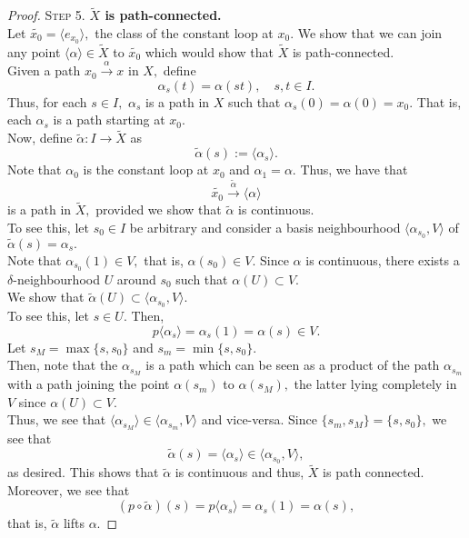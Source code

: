 \documentclass[12pt]{article}
\begin{document}
\begin{proof}
\textsc{Step 5.} \textbf{$\tilde{X}$ is path-connected.}\\
Let $\widetilde{x_0} = \langle e_{x_0}\rangle,$ the class of the constant loop at $x_0.$ We show that we can join any point $\langle \alpha\rangle \in \tilde{X}$ to $\widetilde{x_0}$ which would show that $\tilde{X}$ is path-connected.\\
Given a path $x_0 \overset{\alpha}{\longrightarrow} x$ in $X,$ define
\begin{equation*} 
	\alpha_s(t) = \alpha(st), \quad s, t \in I.
\end{equation*}
Thus, for each $s \in I,$ $\alpha_s$ is a path in $X$ such that $\alpha_s(0) = \alpha(0) = x_0.$ That is, each $\alpha_s$ is a path starting at $x_0.$\\
Now, define $\tilde{\alpha}:I \to \tilde{X}$ as 
\begin{equation*} 
	\tilde{\alpha}(s) := \langle \alpha_s\rangle.
\end{equation*}
Note that $\alpha_0$ is the constant loop at $x_0$ and $\alpha_1 = \alpha.$ Thus, we have that 
\begin{equation*} 
	\widetilde{x_0} \overset{\tilde{\alpha}}{\longrightarrow} \langle \alpha\rangle
\end{equation*}
is a path in $\tilde{X},$ provided we show that $\tilde{\alpha}$ is continuous.\\
To see this, let $s_0 \in I$ be arbitrary and consider a basis neighbourhood $\langle \alpha_{s_0}, V\rangle$ of $\tilde{\alpha}(s) = \alpha_s.$\\
Note that $\alpha_{s_0}(1) \in V,$ that is, $\alpha(s_0) \in V.$ Since $\alpha$ is continuous, there exists a $\delta$-neighbourhood $U$ around $s_0$ such that $\alpha(U) \subset V.$\\
We show that $\tilde{\alpha}(U) \subset \langle \alpha_{s_0}, V\rangle.$\\
To see this, let $s \in U.$ Then,
\begin{equation*} 
	p\langle \alpha_s\rangle = \alpha_s(1) = \alpha(s) \in V.
\end{equation*}
Let $s_M = \max\{s, s_0\}$ and $s_m = \min\{s, s_0\}.$ \\
Then, note that the $\alpha_{s_M}$ is a path which can be seen as a product of the path $\alpha_{s_m}$ with a path joining the point $\alpha(s_m)$ to $\alpha(s_M),$ the latter lying completely in $V$ since $\alpha(U) \subset V.$\\
Thus, we see that $\langle \alpha_{s_M}\rangle \in \langle \alpha_{s_m}, V\rangle$ and vice-versa. Since $\{s_m, s_M\} = \{s, s_0\},$ we see that
\begin{equation*} 
	\tilde{\alpha}(s) = \langle \alpha_s\rangle \in \langle \alpha_{s_0}, V\rangle,
\end{equation*}
as desired. This shows that $\tilde{\alpha}$ is continuous and thus, $\tilde{X}$ is path connected.\\
Moreover, we see that
\begin{equation*} 
	(p\circ\tilde{\alpha})(s) = p\langle \alpha_s\rangle = \alpha_s(1) = \alpha(s),
\end{equation*}
that is, $\tilde{\alpha}$ lifts $\alpha.$ 


\end{proof}
\end{document}
